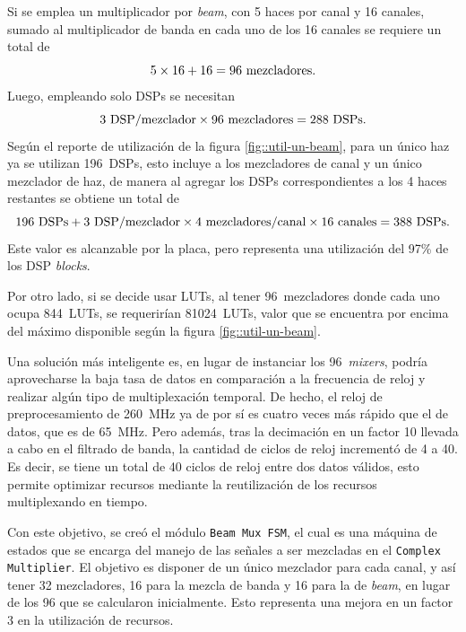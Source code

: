 \documentclass[../../main.tex]{subfiles}
\begin{document}
Si se emplea un multiplicador por \textit{beam}, con 5 haces por canal y 16 canales, sumado al multiplicador de banda en cada uno de los 16 canales se requiere un total de \[5 \times 16 + 16 = 96~\textrm{mezcladores}.\] Luego, empleando solo DSPs se necesitan \[3~\textrm{DSP/mezclador} \times 96~\textrm{mezcladores} = 288~\textrm{DSPs}.\] Según el reporte de utilización de la figura \ref{fig::util-un-beam}, para un único haz ya se utilizan 196~DSPs, esto incluye a los mezcladores de canal y un único mezclador de haz, de manera al agregar los DSPs correspondientes a los 4 haces restantes se obtiene un total de \[196~\textrm{DSPs} + 3~\textrm{DSP/mezclador} \times 4~\textrm{mezcladores/canal} \times 16~\textrm{canales} = 388~\textrm{DSPs}.\] Este valor es alcanzable por la placa, pero representa una utilización del 97\% de los DSP \textit{blocks}.

Por otro lado, si se decide usar LUTs, al tener 96~mezcladores donde cada uno ocupa 844~LUTs, se requerirían 81024~LUTs, valor que se encuentra por encima del máximo disponible según la figura \ref{fig::util-un-beam}.

Una solución más inteligente es, en lugar de instanciar los 96~\textit{mixers}, podría aprovecharse la baja tasa de datos en comparación a la frecuencia de reloj y realizar algún tipo de multiplexación temporal. De hecho, el reloj de preprocesamiento de 260~MHz ya de por sí es cuatro veces más rápido que el de datos, que es de 65~MHz. Pero además, tras la decimación en un factor 10 llevada a cabo en el filtrado de banda, la cantidad de ciclos de reloj incrementó de 4 a 40. Es decir, se tiene un total de 40 ciclos de reloj entre dos datos válidos, esto permite optimizar recursos mediante la reutilización de los recursos multiplexando en tiempo.

Con este objetivo, se creó el módulo \texttt{Beam Mux FSM}, el cual es una máquina de estados que se encarga del manejo de las señales a ser mezcladas en el \texttt{Complex Multiplier}. El objetivo es disponer de un único mezclador para cada canal, y así tener 32 mezcladores, 16 para la mezcla de banda y 16 para la de \textit{beam}, en lugar de los 96 que se calcularon inicialmente. Esto representa una mejora en un factor 3 en la utilización de recursos.
\end{document}
